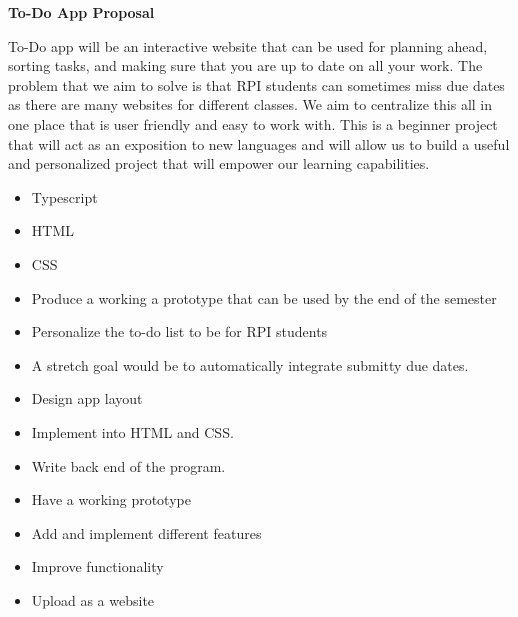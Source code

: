 \documentclass[12pt]{article}
\begin{document}
{\huge \bf To-Do App Proposal}

\bigskip


\bigskip

\noindent To-Do app will be an interactive website that can be used for planning ahead, sorting tasks, 
and making sure that you are up to date on all your work. The problem that we aim to solve is that RPI 
students can sometimes miss due dates as there are many websites for different classes.
We aim to centralize this all in one place that is user friendly and easy to work with.
This is a beginner project that will act as an exposition to new languages and will allow us to
build a useful and personalized project that will empower our learning capabilities.

\bigskip

\begin{itemize}{}
  \item Typescript
  \item HTML
  \item CSS
\end{itemize}

\bigskip

\begin{itemize}
  \item Produce a working a prototype that can be used by the end of the semester
  \item Personalize the to-do list to be for RPI students
  \item A stretch goal would be to automatically integrate submitty due dates.
\end{itemize}
\bigskip


\medskip

\begin{itemize}
  \item Design app layout
  \item Implement into HTML and CSS.
\end{itemize}

\begin{itemize}
  \item Write back end of the program.
  \item Have a working prototype
\end{itemize}

\begin{itemize}
  \item Add and implement different features
  \item Improve functionality
  \item Upload as a website
\end{itemize}
\end{document}
